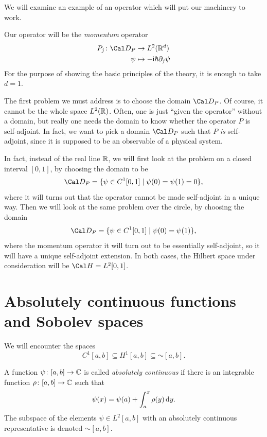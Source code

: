 
We will examine an example of an operator which will put our machinery
to work.

Our operator will be the \emph{momentum} operator
\begin{align}
  P_j \colon \Cal D_P &\to L^{2}(\R^{d}) \\
  \psi & \mapsto -\ic\hbar \partial_j\psi
\end{align}
For the purpose of showing the basic principles of the theory,
it is enough to take \(d=1\).

The first problem we must address is to choose the domain \(\Cal
D_P\). Of course, it cannot be the whole space \(L^{2}(\mathbb{R})\).
Often, one is just ``given the operator'' without a domain, but really
one needs the domain to know whether the operator \(P\) is
self-adjoint. In fact, we want to pick a domain \(\Cal D_P\) such
that \(P\) \emph{is} self-adjoint, since it is supposed to be an
observable of a physical system.

In fact, instead of the real line \(\mathbb{R}\), we will first look at the
problem on a closed interval \([0,1]\), by choosing the domain to be
\begin{equation}
  \Cal D_P = \{\psi\in C^{1}[0,1] \mid \psi(0)=\psi(1)=0\}
,\end{equation}
where it will turns out that the operator cannot be made self-adjoint
in a unique way.
Then we will look at the same problem over the circle, by choosing the
domain
\begin{equation}
  \Cal D_P = \{\psi\in C^{1}[0,1] \mid \psi(0)=\psi(1)\}
,\end{equation}
where the momentum operator it will turn out to be essentially
self-adjoint, so it will have a unique self-adjoint extension.
In both cases, the Hilbert space under consideration will be \(\Cal
H=L^{2}[0,1]\).

\section{Absolutely continuous functions and Sobolev spaces}

We will encounter the spaces
\begin{equation}
  C^{1}[a,b] \subseteq H^{1}[a,b] \subseteq \AC[a,b]
.\end{equation}

\begin{definition}
  A function \(\psi\colon[a,b]\to\mathbb{C}\) is called \emph{absolutely
  continuous} if there is an integrable function
  \(\rho\colon[a,b]\to\mathbb{C}\) such that
  \begin{equation}
    \label{eq:abscont}
    \psi(x) = \psi(a) + \int_{a}^{x}\rho(y)\mathop{}\!\mathrm{d} y
  .\end{equation}
  The subspace of the elements \(\psi\in L^{2}[a,b]\) with an absolutely
  continuous representative is denoted \(\AC[a,b]\).
\end{definition}

